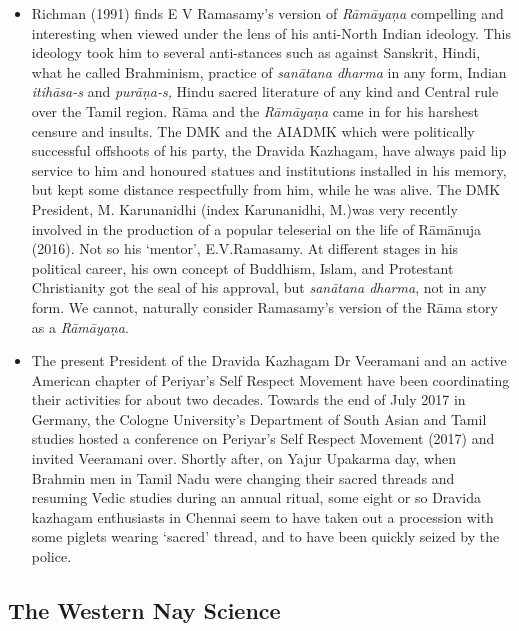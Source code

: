 \begin{itemize}
 \item Richman (1991) finds E V Ramasamy’s version of \textit{Rāmāyaņa} compelling and interesting when viewed under the lens of his anti-North Indian ideology. This ideology took him to several anti-stances such as against Sanskrit, Hindi, what he called Brahminism, practice of \textit{sanātana dharma} in any form, Indian \textit{itihāsa-s} and \textit{purāṇa-s,} Hindu sacred literature of any kind and Central rule over the Tamil region. Rāma and the \textit{Rāmāyaṇa} came in for his harshest censure and insults. The DMK and the AIADMK which were politically successful offshoots of his party, the Dravida Kazhagam, have always paid lip service to him and honoured statues and institutions installed in his memory, but kept some distance respectfully from him, while he was alive. The DMK President, M. Karunanidhi (index Karunanidhi, M.)was very recently involved in the production of a popular teleserial on the life of Rāmānuja (2016). Not so his ‘mentor’, E.V.Ramasamy. At different stages in his political career, his own concept of Buddhism, Islam, and Protestant Christianity got the seal of his approval, but \textit{sanātana dharma}, not in any form. We cannot, naturally consider Ramasamy’s version of the Rāma story as a \textit{Rāmāyaṇa}.

 \item The present President of the Dravida Kazhagam Dr Veeramani and an active American chapter of Periyar’s Self Respect Movement have been coordinating their activities for about two decades. Towards the end of July 2017 in Germany, the Cologne University’s Department of South Asian and Tamil studies hosted a conference on Periyar’s Self Respect Movement (2017) and invited Veeramani over. Shortly after, on Yajur Upakarma day, when Brahmin men in Tamil Nadu were changing their sacred threads and resuming Vedic studies during an annual ritual, some eight or so Dravida kazhagam enthusiasts in Chennai seem to have taken out a procession with some piglets wearing ‘sacred’ thread, and to have been quickly seized by the police.

\end{itemize}


\subsection*{The Western Nay Science}

